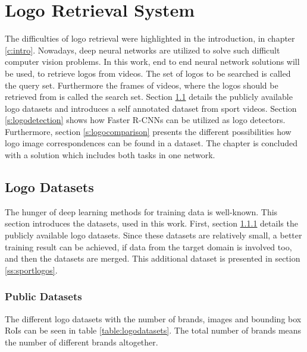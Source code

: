 \chapter{Logo Retrieval System}\label{c:logoretrievalsystem}

The difficulties of logo retrieval were highlighted in the introduction, in chapter \ref{c:intro}. Nowadays, deep neural networks are utilized to solve such difficult computer vision problems. In this work, end to end neural network solutions will be used, to retrieve logos from videos. The set of logos to be searched is called the query set. Furthermore the frames of videos, where the logos should be retrieved from is called the search set.
\bigbreak
Section \ref{s:logodatasets} details the publicly available logo datasets and introduces a self annotated dataset from sport videos. Section \ref{s:logodetection} shows how Faster R-CNNs can be utilized as logo detectors. Furthermore, section \ref{s:logocomparison} presents the different possibilities how logo image correspondences can be found in a dataset. The chapter is concluded with a solution which includes both tasks in one network.
\bigbreak
\section{Logo Datasets}\label{s:logodatasets}
The hunger of deep learning methods for training data is well-known. This section introduces the datasets, used in this work. First, section \ref{ss:publicdatasets} details the publicly available logo datasets. Since these datasets are relatively small, a better training result can be achieved, if data from the target domain is involved too, and then the datasets are merged. This additional dataset is presented in section \ref{ss:sportlogos}.
\bigbreak
\subsection{Public Datasets}\label{ss:publicdatasets}
The different logo datasets with the number of brands, images and bounding box RoIs can be seen in table \ref{table:logodatasets}. The total number of brands means the number of different brands altogether.

